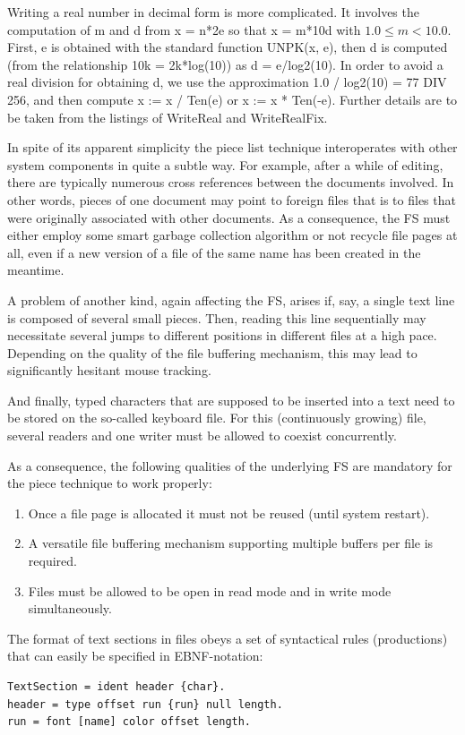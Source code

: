 Writing a real number in decimal form is more complicated. It involves the computation of m and d
from x = n*2e so that x = m*10d with $1.0 \leq m < 10.0$. First, e is obtained with the standard function
UNPK(x, e), then d is computed (from the relationship 10k = 2k*log(10)) as d = e/log2(10). In order to
avoid a real division for obtaining d, we use the approximation 1.0 / log2(10) = 77 DIV 256, and then
compute x := x / Ten(e) or x := x * Ten(-e). Further details are to be taken from the listings of
WriteReal and WriteRealFix.

In spite of its apparent simplicity the piece list technique interoperates with other system
components in quite a subtle way. For example, after a while of editing, there are typically
numerous cross references between the documents involved. In other words, pieces of one
document may point to foreign files that is to files that were originally associated with other
documents. As a consequence, the FS must either employ some smart garbage collection
algorithm or not recycle file pages at all, even if a new version of a file of the same name has been
created in the meantime.

A problem of another kind, again affecting the FS, arises if, say, a single text line is
composed of several small pieces. Then, reading this line sequentially may necessitate several
jumps to different positions in different files at a high pace. Depending on the quality of the file
buffering mechanism, this may lead to significantly hesitant mouse tracking.

And finally, typed characters that are supposed to be inserted into a text need to be stored on the
so-called keyboard file. For this (continuously growing) file, several readers and one writer must be
allowed to coexist concurrently.

As a consequence, the following qualities of the underlying FS are mandatory for the piece
technique to work properly:
\begin{enumerate}
	\item Once a file page is allocated it must not be reused (until system restart).
	\item A versatile file buffering mechanism supporting multiple buffers per file is required.
	\item Files must be allowed to be open in read mode and in write mode simultaneously.
\end{enumerate}
The format of text sections in files obeys a set of syntactical rules (productions) that can easily be
specified in EBNF-notation:
\begin{verbatim}
TextSection = ident header {char}.
header = type offset run {run} null length.
run = font [name] color offset length.
\end{verbatim}

